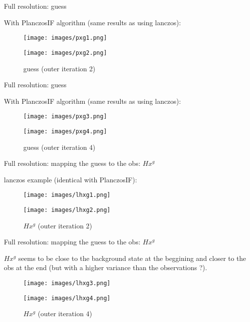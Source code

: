 \documentclass[francais]{beamer}
\begin{document}
\begin{frame}{Full resolution: guess}
\begin{center}
With PlanczosIF algorithm (same results as using lanczos):\\
\begin{figure}
  \texttt{[image: images/pxg1.png]}
  \caption{guess (outer iteration 1)}
\endminipage\hfill
{}
  \texttt{[image: images/pxg2.png]}
  \caption{guess (outer iteration 2)}
\endminipage
\end{figure}
\end{center}
\end{frame}

\begin{frame}{Full resolution: guess}
\begin{center}
With PlanczosIF algorithm (same results as using lanczos):
\begin{figure}
  \texttt{[image: images/pxg3.png]}
  \caption{guess (outer iteration 3)}
\endminipage \hfill
{}%
  \texttt{[image: images/pxg4.png]}
  \caption{guess (outer iteration 4)}
\endminipage
\end{figure}
\end{center}
\end{frame}

\begin{frame}{Full resolution: mapping the guess to the obs: $H x^g$}
\begin{center}
lanczos example (identical with PlanczosIF):
\begin{figure}
  \texttt{[image: images/lhxg1.png]}
  \caption{$H x^g$ (outer iteration 1)}
\endminipage\hfill
{}
  \texttt{[image: images/lhxg2.png]}
  \caption{$H x^g$ (outer iteration 2)}
\endminipage
\end{figure}
\end{center}
\end{frame}

\begin{frame}{Full resolution: mapping the guess to the obs: $H x^g$}
\begin{center}
$Hx^g$ seems to be close to the background state at the beggining and closer to the obs at the end (but with a higher variance than the observations ?). 
\begin{figure}
  \texttt{[image: images/lhxg3.png]}
  \caption{$H x^g$ (outer iteration 3)}
\endminipage \hfill
{}%
  \texttt{[image: images/lhxg4.png]}
  \caption{$H x^g$ (outer iteration 4)}
\endminipage
\end{figure}
\end{center}
\end{frame}
\end{document}
